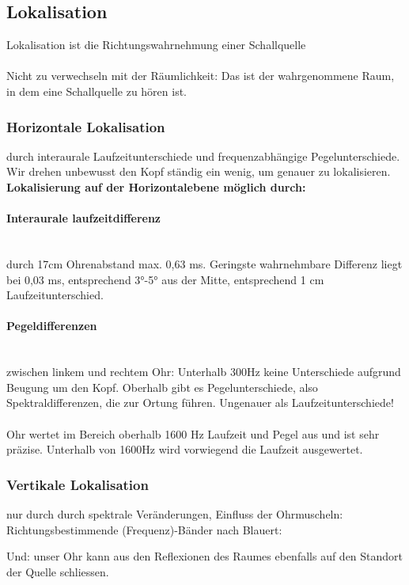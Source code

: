 \subsection{Lokalisation}
Lokalisation ist die Richtungswahrnehmung einer Schallquelle\\~\\
Nicht zu verwechseln mit der Räumlichkeit: Das ist der wahrgenommene Raum, in dem eine Schallquelle zu hören ist.



\subsubsection{Horizontale Lokalisation}
durch interaurale Laufzeitunterschiede und frequenzabhängige Pegelunterschiede. Wir drehen unbewusst den Kopf ständig ein wenig, um genauer zu lokalisieren.\\

\textbf{Lokalisierung auf der Horizontalebene möglich durch:}\\
\paragraph{Interaurale laufzeitdifferenz}~\\
durch 17cm Ohrenabstand max. 0,63 ms. Geringste wahrnehmbare Differenz liegt bei 0,03 ms, entsprechend 3°-5° aus der Mitte, entsprechend 1 cm Laufzeitunterschied.
\paragraph{Pegeldifferenzen}~\\
zwischen linkem und rechtem Ohr: Unterhalb 300Hz keine Unterschiede aufgrund Beugung um den Kopf. Oberhalb gibt es Pegelunterschiede, also Spektraldifferenzen, die zur Ortung führen. Ungenauer als Laufzeitunterschiede!\\~\\
Ohr wertet im Bereich oberhalb 1600 Hz Laufzeit und Pegel aus und ist sehr präzise. Unterhalb von 1600Hz wird vorwiegend die Laufzeit ausgewertet.

\subsubsection{Vertikale Lokalisation}
nur durch durch spektrale Veränderungen, Einfluss der Ohrmuscheln: Richtungsbestimmende (Frequenz)-Bänder nach Blauert:

Und: unser Ohr kann aus den Reflexionen des Raumes ebenfalls auf den Standort der Quelle schliessen.